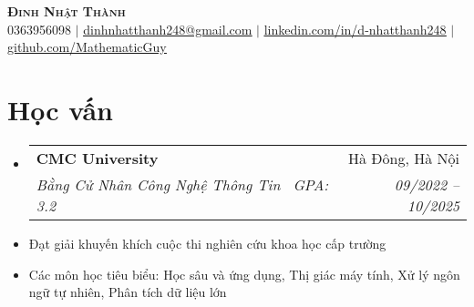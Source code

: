 \documentclass[letterpaper,11pt]{article}
\makeatletter
\newcommand{\resumeItem}[1]{
	\item\small{
	{#1 \vspace{-2pt}}
	}
}
\newcommand{\resumeSubheading}[4]{
	\vspace{-2pt}\item
	\begin{tabular*}{0.97\textwidth}[t]{l@{\extracolsep{\fill}}r}
		\textbf{#1} & #2 \\
		\textit{\small#3} & \textit{\small #4} \\
	\end{tabular*}\vspace{-7pt}
}
\newcommand{\resumeSubHeadingListStart}{\begin{itemize}[leftmargin=0.15in, label={}]}
\newcommand{\resumeSubHeadingListEnd}{\end{itemize}}
\makeatother
\begin{document}

\begin{center}
    \textbf{\Huge \scshape Đinh Nhật Thành} \\ \vspace{1pt}
    \small 0363956098 $|$ \href{mailto:x@x.com}{\underline{dinhnhatthanh248@gmail.com}} $|$
    \href{https://linkedin.com/in/...}{\underline{linkedin.com/in/d-nhatthanh248}} $|$
    \href{https://github.com/...}{\underline{github.com/MathematicGuy}}
\end{center}


\section{Học vấn}
	\resumeSubHeadingListStart
	\resumeSubheading
		{CMC University} {Hà Đông, Hà Nội}
		{Bằng Cử Nhân Công Nghệ Thông Tin \textbar \ GPA: 3.2}{09/2022 -- 10/2025}
		\resumeItem{Đạt giải khuyến khích cuộc thi nghiên cứu khoa học cấp trường}
		\resumeItem{Các môn học tiêu biểu: Học sâu và ứng dụng, Thị giác máy tính, Xử lý ngôn ngữ tự nhiên, Phân tích dữ liệu lớn}
	\resumeSubHeadingListEnd

\end{document}
